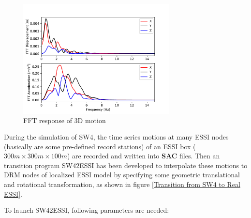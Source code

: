 \begin{figure}[H]
  \centering
  \includegraphics[width = 8cm]{./Figure-files/Day2/Apply_3D_Motions_from_SW4/3D_seismic_motion_by_SW4/frequency_response.pdf}
  \caption{FFT response of 3D motion}
  \label{3D_motion_fft_response}
\end{figure}

During the simulation of SW4, the time series motions at many ESSI nodes (basically are some pre-defined record stations) of an ESSI box ($300m\times300m\times100m$) are recorded and written into \textbf{SAC} files. 
%
Then an transition program SW42ESSI has been developed to interpolate these motions to DRM nodes of localized ESSI model by specifying some geometric translational and rotational transformation, as shown in figure \ref{Transition from SW4 to Real ESSI}. 
%

To launch SW42ESSI, following parameters are needed: 

